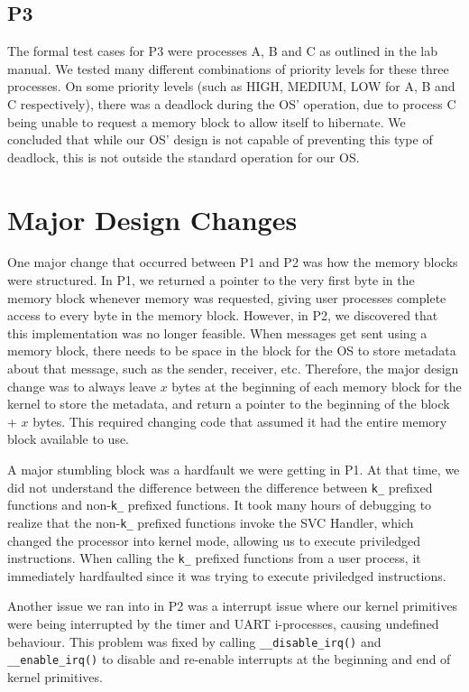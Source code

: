 \documentclass[12pt]{report}
\begin{document}
\subsection{P3}

The formal test cases for P3 were processes A, B and C as outlined in the lab manual.  We tested many different combinations of priority levels for these three processes.  On some priority levels (such as HIGH, MEDIUM, LOW for A, B and C respectively), there was a deadlock during the OS' operation, due to process C being unable to request a memory block to allow itself to hibernate.  We concluded that while our OS' design is not capable of preventing this type of deadlock, this is not outside the standard operation for our OS.

\section{Major Design Changes}

One major change that occurred between P1 and P2 was how the memory blocks were structured. In P1, we returned a pointer to the very first byte in the memory block whenever memory was requested, giving user processes complete access to every byte in the memory block. However, in P2, we discovered that this implementation was no longer feasible. When messages get sent using a memory block, there needs to be space in the block for the OS to store metadata about that message, such as the sender, receiver, etc. Therefore, the major design change was to always leave $x$ bytes at the beginning of each memory block for the kernel to store the metadata, and return a pointer to the beginning of the block + $x$ bytes. This required changing code that assumed it had the entire memory block available to use.

A major stumbling block was a hardfault we were getting in P1. At that time, we did not understand the difference between the difference between \texttt{k_} prefixed functions and non-\texttt{k_} prefixed functions. It took many hours of debugging to realize that the non-\texttt{k_} prefixed functions invoke the SVC Handler, which changed the processor into kernel mode, allowing us to execute priviledged instructions. When calling the \texttt{k_} prefixed functions from a user process, it immediately hardfaulted since it was trying to execute priviledged instructions.

Another issue we ran into in P2 was a interrupt issue where our kernel primitives were being interrupted by the timer and UART i-processes, causing undefined behaviour. This problem was fixed by calling \texttt{__disable_irq()} and \texttt{__enable_irq()} to disable and re-enable interrupts at the beginning and end of kernel primitives.
\end{document}
